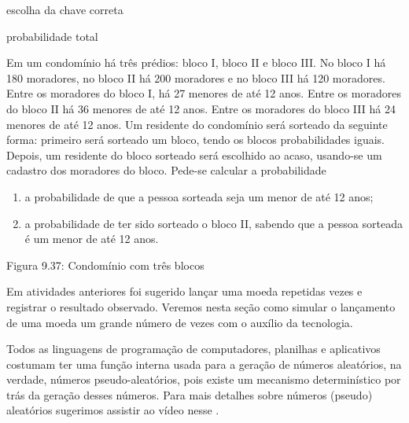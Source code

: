 \begin{task}{escolha da chave correta}
\label{ativ-chaves}
\end{task}

\begin{task}{probabilidade total}
\label{ativ-tbayes}

Em um condomínio há três prédios: bloco I, bloco II e bloco III. No bloco I há 180 moradores, no bloco II há 200 moradores e no bloco III há 120 moradores. Entre os moradores do bloco I, há 27 menores de até 12 anos. Entre os moradores do bloco II há 36 menores de até 12 anos. Entre os moradores do bloco III há 24 menores de até 12 anos. Um residente do condomínio será sorteado da seguinte forma: primeiro será sorteado um bloco, tendo os blocos probabilidades iguais.  Depois, um residente do bloco sorteado será escolhido ao acaso, usando-se um cadastro dos moradores do bloco. Pede-se calcular a probabilidade
\begin{enumerate}
\item {} 
a probabilidade de que a pessoa sorteada seja um menor de até 12 anos;

\item {} 
a probabilidade de ter sido sorteado o bloco II, sabendo que a pessoa sorteada é um menor de até 12 anos.
  
\end{enumerate}
\label{\detokenize{PE511-8:id3}}
\begin{figure}[H]
\centering

\noindent{}
\label{\detokenize{PE511-8:id3}}\end{figure}

Figura 9.37: Condomínio com três blocos
\end{task}


\know{ }
\label{\detokenize{PE511-A::doc}}\label{\detokenize{PE511-A:para-saber-mais}}
Em atividades anteriores foi sugerido lançar uma moeda repetidas vezes e registrar o resultado observado.  Veremos nesta seção como simular o lançamento de uma moeda um grande número de vezes com o auxílio da tecnologia.

Todos as linguagens de programação de computadores, planilhas e aplicativos costumam ter uma função interna usada para a geração de números aleatórios, na verdade, números pseudo-aleatórios, pois existe um mecanismo determinístico por trás da geração desses números.  Para mais detalhes sobre números (pseudo) aleatórios sugerimos assistir ao vídeo nesse  .

